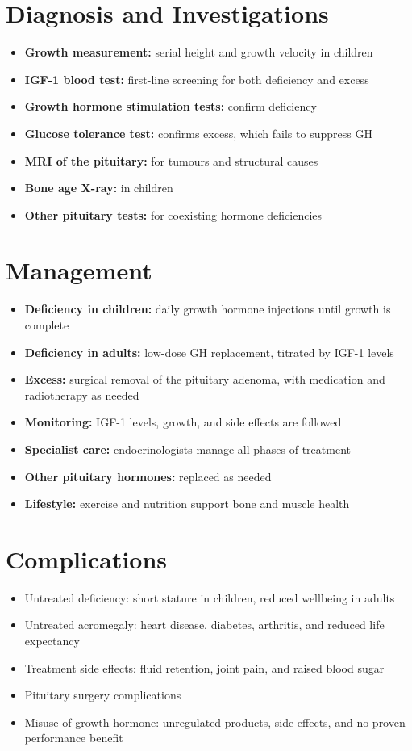 \section*{Diagnosis and Investigations}
\begin{itemize}
    \item \textbf{Growth measurement:} serial height and growth velocity in children
    \item \textbf{IGF-1 blood test:} first-line screening for both deficiency and excess
    \item \textbf{Growth hormone stimulation tests:} confirm deficiency
    \item \textbf{Glucose tolerance test:} confirms excess, which fails to suppress GH
    \item \textbf{MRI of the pituitary:} for tumours and structural causes
    \item \textbf{Bone age X-ray:} in children
    \item \textbf{Other pituitary tests:} for coexisting hormone deficiencies
\end{itemize}

\section*{Management}
\begin{itemize}
    \item \textbf{Deficiency in children:} daily growth hormone injections until growth is complete
    \item \textbf{Deficiency in adults:} low-dose GH replacement, titrated by IGF-1 levels
    \item \textbf{Excess:} surgical removal of the pituitary adenoma, with medication and radiotherapy as needed
    \item \textbf{Monitoring:} IGF-1 levels, growth, and side effects are followed
    \item \textbf{Specialist care:} endocrinologists manage all phases of treatment
    \item \textbf{Other pituitary hormones:} replaced as needed
    \item \textbf{Lifestyle:} exercise and nutrition support bone and muscle health
\end{itemize}

\section*{Complications}
\begin{itemize}
    \item Untreated deficiency: short stature in children, reduced wellbeing in adults
    \item Untreated acromegaly: heart disease, diabetes, arthritis, and reduced life expectancy
    \item Treatment side effects: fluid retention, joint pain, and raised blood sugar
    \item Pituitary surgery complications
    \item Misuse of growth hormone: unregulated products, side effects, and no proven performance benefit
\end{itemize}


